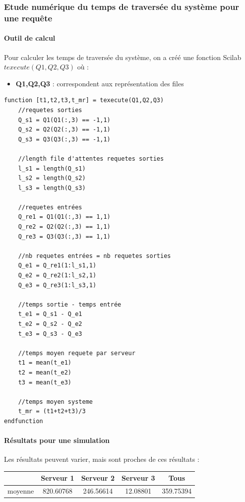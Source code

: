 \documentclass{article}
\begin{document}
\subsubsection{Etude numérique du temps de traversée du système pour une requête}

\paragraph{Outil de calcul}
Pour calculer les temps de traversée du système, on a créé une fonction Scilab $texecute(Q1,Q2,Q3)$ où :
\begin{itemize}
	\item \textbf{Q1,Q2,Q3} : correspondent aux représentation des files 
\end{itemize}
\begin{verbatim}
function [t1,t2,t3,t_mr] = texecute(Q1,Q2,Q3)
    //requetes sorties
    Q_s1 = Q1(Q1(:,3) == -1,1)
    Q_s2 = Q2(Q2(:,3) == -1,1)
    Q_s3 = Q3(Q3(:,3) == -1,1)

    //length file d'attentes requetes sorties
    l_s1 = length(Q_s1)
    l_s2 = length(Q_s2)
    l_s3 = length(Q_s3)

    //requetes entrées
    Q_re1 = Q1(Q1(:,3) == 1,1)
    Q_re2 = Q2(Q2(:,3) == 1,1)
    Q_re3 = Q3(Q3(:,3) == 1,1)

    //nb requetes entrées = nb requetes sorties
    Q_e1 = Q_re1(1:l_s1,1)
    Q_e2 = Q_re2(1:l_s2,1)
    Q_e3 = Q_re3(1:l_s3,1)

    //temps sortie - temps entrée 
    t_e1 = Q_s1 - Q_e1
    t_e2 = Q_s2 - Q_e2
    t_e3 = Q_s3 - Q_e3

    //temps moyen requete par serveur
    t1 = mean(t_e1)
    t2 = mean(t_e2)
    t3 = mean(t_e3)

    //temps moyen systeme
    t_mr = (t1+t2+t3)/3
endfunction
\end{verbatim}

\paragraph{Résultats pour une simulation}
Les résultats peuvent varier, mais sont proches de ces résultats :
\begin{center}
	\begin{tabular}{c|ccc|c}
		\hline \hline
		& Serveur 1 & Serveur 2 & Serveur 3 & Tous \\
		\hline
		moyenne & 820.60768 & 246.56614 & 12.08801 & 359.75394 \\
		\hline \hline
	\end{tabular}
\end{center}
\end{document}
